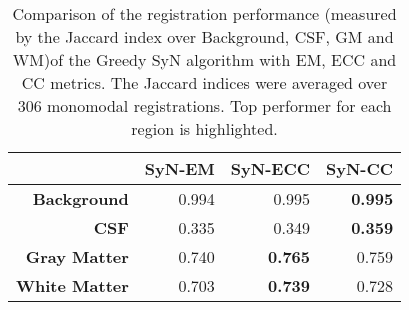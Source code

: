 \begin{table}[htbp]
  \centering
  {\small
    \begin{tabular}{rrrr}
    \toprule
    \textbf{} & \textbf{SyN-EM} & \textbf{SyN-ECC} & \textbf{SyN-CC} \\
    \midrule
    \textbf{Background} & 0.994 & 0.995 & \textbf{0.995} \\
    \textbf{CSF} & 0.335 & 0.349 & \textbf{0.359} \\
    \textbf{Gray Matter} & 0.740 & \textbf{0.765} & 0.759 \\
    \textbf{White Matter} & 0.703 & \textbf{0.739} & 0.728 \\
    \bottomrule
    \end{tabular}%
    \caption{Comparison of the registration performance (measured by the Jaccard index over Background, CSF, GM and WM)of the Greedy SyN algorithm with EM, ECC and CC metrics. The Jaccard
indices were averaged over 306 monomodal registrations. Top performer for each region is highlighted.}
  \label{tab:monomodal_results_segTri_fill}}%
\end{table}%
